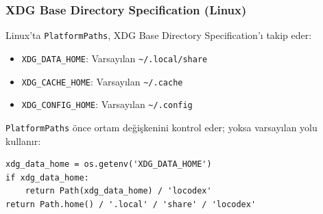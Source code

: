 \begin{table}[H]
\centering
\caption{Platform bazl{\i} veri dizinleri.}
\label{tab:platform-paths}
\end{table}

\subsubsection{XDG Base Directory Specification (Linux)}

Linux'ta \texttt{PlatformPaths}, XDG Base Directory Specification'{\i} takip eder:

\begin{itemize}
  \item \texttt{XDG\_DATA\_HOME}: Varsay{\i}lan \texttt{\~{}/.local/share}
  \item \texttt{XDG\_CACHE\_HOME}: Varsay{\i}lan \texttt{\~{}/.cache}
  \item \texttt{XDG\_CONFIG\_HOME}: Varsay{\i}lan \texttt{\~{}/.config}
\end{itemize}

\texttt{PlatformPaths} \"{o}nce ortam de\u{g}i\c{s}kenini kontrol eder; yoksa varsay{\i}lan yolu kullan{\i}r:

\begin{verbatim}
xdg_data_home = os.getenv('XDG_DATA_HOME')
if xdg_data_home:
    return Path(xdg_data_home) / 'locodex'
return Path.home() / '.local' / 'share' / 'locodex'
\end{verbatim}

